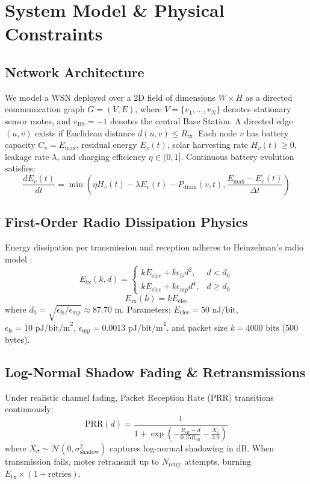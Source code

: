 \documentclass[conference]{IEEEtran}
\begin{document}
\section{System Model \& Physical Constraints}

\subsection{Network Architecture}
We model a WSN deployed over a 2D field of dimensions $W \times H$ as a directed communication graph $G = (V, E)$, where $V = \{v_1, \dots, v_N\}$ denotes stationary sensor motes, and $v_{\text{BS}} = -1$ denotes the central Base Station. A directed edge $(u, v)$ exists if Euclidean distance $d(u, v) \le R_{\text{tx}}$. Each node $v$ has battery capacity $C_v = E_{\text{max}}$, residual energy $E_v(t)$, solar harvesting rate $H_v(t) \ge 0$, leakage rate $\lambda$, and charging efficiency $\eta \in (0, 1]$. Continuous battery evolution satisfies:
\begin{equation}
\frac{dE_v(t)}{dt} = \min\left( \eta H_v(t) - \lambda E_v(t) - P_{\text{drain}}(v, t), \frac{E_{\text{max}} - E_v(t)}{\Delta t} \right)
\end{equation}

\subsection{First-Order Radio Dissipation Physics}
Energy dissipation per transmission and reception adheres to Heinzelman's radio model \cite{heinzelman2002application}:
\begin{equation}
E_{\text{tx}}(k, d) = 
\begin{cases}
k E_{\text{elec}} + k \epsilon_{\text{fs}} d^2, & d < d_0 \\
k E_{\text{elec}} + k \epsilon_{\text{mp}} d^4, & d \ge d_0
\end{cases}
\end{equation}
\begin{equation}
E_{\text{rx}}(k) = k E_{\text{elec}}
\end{equation}
where $d_0 = \sqrt{\epsilon_{\text{fs}} / \epsilon_{\text{mp}}} \approx 87.70\text{ m}$. Parameters: $E_{\text{elec}} = 50\text{ nJ/bit}$, $\epsilon_{\text{fs}} = 10\text{ pJ/bit/m}^2$, $\epsilon_{\text{mp}} = 0.0013\text{ pJ/bit/m}^4$, and packet size $k = 4000\text{ bits}$ (500 bytes).

\subsection{Log-Normal Shadow Fading \& Retransmissions}
Under realistic channel fading, Packet Reception Rate (PRR) transitions continuously:
\begin{equation}
\text{PRR}(d) = \frac{1}{1 + \exp\left( -\frac{R_{\text{eff}} - d}{0.15 R_{\text{eff}}} - \frac{X_\sigma}{3.0} \right)}
\end{equation}
where $X_\sigma \sim \mathcal{N}(0, \sigma_{\text{shadow}}^2)$ captures log-normal shadowing in dB. When transmission fails, motes retransmit up to $N_{\text{retry}}$ attempts, burning $E_{\text{tx}} \times (1 + \text{retries})$.
\end{document}
